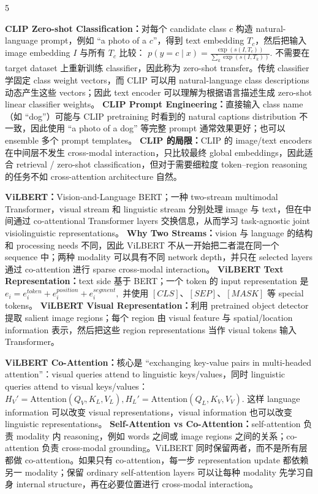 \documentclass[a4paper, landscape]{article}
\begin{document}
\begin{multicols}{5}
\par \textbf{CLIP Zero-shot Classification：}对每个 candidate class \(c\) 构造 natural-language prompt，例如 ``a photo of a \(c\)''，得到 text embedding \(T_c\)，然后把输入 image embedding \(I\) 与所有 \(T_c\) 比较：
\(
p(y=c\mid x)
=
\frac{\exp(s(I,T_c))}
{\sum_k\exp(s(I,T_k))}.
\)
不需要在 target dataset 上重新训练 classifier，因此称为 zero-shot transfer。传统 classifier 学固定 class weight vectors，而 CLIP 可以用 natural-language class descriptions 动态产生这些 vectors；因此 text encoder 可以理解为根据语言描述生成 zero-shot linear classifier weights。
\textbf{CLIP Prompt Engineering：}直接输入 class name（如 ``dog''）可能与 CLIP pretraining 时看到的 natural captions distribution 不一致，因此使用 ``a photo of a dog'' 等完整 prompt 通常效果更好；也可以 ensemble 多个 prompt templates。
\textbf{CLIP 的局限：}CLIP 的 image/text encoders 在中间层不发生 cross-modal interaction，只比较最终 global embeddings，因此适合 retrieval / zero-shot classification，但对于需要细粒度 token--region reasoning 的任务不如 cross-attention architecture 自然。

\par \textbf{ViLBERT：}Vision-and-Language BERT；一种 two-stream multimodal Transformer，visual stream 和 linguistic stream 分别处理 image 与 text，但在中间通过 co-attentional Transformer layers 交换信息，从而学习 task-agnostic joint visiolinguistic representations。
\textbf{Why Two Streams：}vision 与 language 的结构和 processing needs 不同，因此 ViLBERT 不从一开始把二者混在同一个 sequence 中；两种 modality 可以具有不同 network depth，并只在 selected layers 通过 co-attention 进行 sparse cross-modal interaction。
\textbf{ViLBERT Text Representation：}text side 基于 BERT；一个 token 的 input representation 是
\(
e_i=e_i^{token}+e_i^{position}+e_i^{segment},
\)
并使用 \([CLS]\)、\([SEP]\)、\([MASK]\) 等 special tokens。
\textbf{ViLBERT Visual Representation：}利用 pretrained object detector 提取 salient image regions；每个 region 由 visual feature 与 spatial/location information 表示，然后把这些 region representations 当作 visual tokens 输入 Transformer。

\par \textbf{ViLBERT Co-Attention：}核心是 ``exchanging key-value pairs in multi-headed attention''：visual queries attend to linguistic keys/values，同时 linguistic queries attend to visual keys/values：
\(
H_V'
=
\mathrm{Attention}(Q_V,K_L,V_L),
H_L'
=
\mathrm{Attention}(Q_L,K_V,V_V).
\)
这样 language information 可以改变 visual representations，visual information 也可以改变 linguistic representations。
\textbf{Self-Attention vs Co-Attention：}self-attention 负责 modality 内 reasoning，例如 words 之间或 image regions 之间的关系；co-attention 负责 cross-modal grounding。ViLBERT 同时保留两者，而不是所有层都做 co-attention。如果只有 co-attention，每一步 representation update 都依赖另一 modality；保留 ordinary self-attention layers 可以让每种 modality 先学习自身 internal structure，再在必要位置进行 cross-modal interaction。


\end{multicols}
\end{document}
